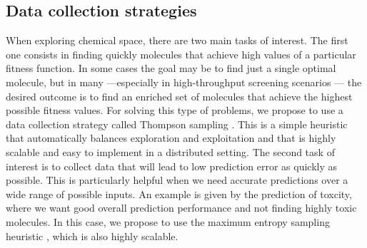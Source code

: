 \subsection{Data collection strategies}

When exploring chemical space, there are two main tasks of interest. The first one consists in finding quickly molecules that achieve high values of a particular fitness function. In some cases the goal may be to find just a single optimal molecule, but in many ---especially in high-throughput screening scenarios \cite{Pyzer_Knapp_2015a}--- the desired outcome is to find 
an enriched set of molecules that achieve the highest possible fitness values. For solving this type of problems, we propose to use a data collection strategy called Thompson sampling \cite{Thompson_1933}. This is a simple heuristic that automatically balances exploration and exploitation \cite{Chapelle2011} and that is highly scalable and easy to implement in a distributed setting.
The second task of interest is to collect data that will lead to low prediction error as quickly as possible. This is particularly helpful when we need accurate predictions over a wide range of possible inputs. An example is given by the prediction of toxcity, where we want good overall prediction performance and not finding highly toxic molecules. In this case, we propose to use the maximum entropy sampling heuristic \cite{MacKay_1992}, which is also highly scalable.